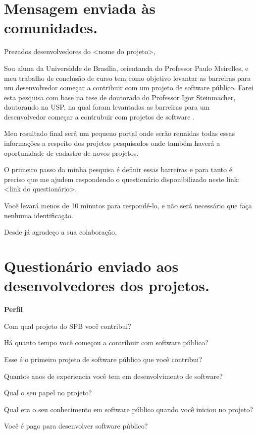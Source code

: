 \begin{anexosenv}

\partanexos

\chapter{Mensagem enviada às comunidades.}
\label{anexo a}

Prezados desenvolvedores do <nome do projeto>,

Sou aluna da Universidde de Brasília, orientanda do Professor
Paulo Meirelles, e meu trabalho de conclusão de curso tem como 
objetivo levantar as barreiras para um desenvolvedor 
começar a contribuir com um projeto de software público. Farei esta pesquisa 
com base na tese de doutorado do Professor Igor Steinmacher, doutorando na USP,
na qual foram levantadas as barreiras para um desenvolvedor começar a contrubuir 
com projetos de software .

Meu resultado final será um pequeno portal onde serão reunidas todas essas informações
a respeito dos projetos pesquisados onde também haverá a oportunidade de cadastro de
novos projetos.

O primeiro passo da minha pesquisa é definir essas barreiras e para tanto é
preciso que me ajudem respondendo o questionário disponibilizado neste link:
<link do questionário>.

Você levará menos de 10 minutos para respondê-lo, e não será necessário que faça
nenhuma identificação.

Desde já agradeço a sua colaboração,

\chapter{Questionário enviado aos desenvolvedores dos projetos.}
\label{anexo b}

\textbf{Perfil}

Com qual projeto do SPB você contribui?

Há quanto tempo você começou a contribuir com software público?

Esse é o primeiro projeto de software público que você contribui?

Quantos anos de experiencia você tem em desenvolvimento de software?

Qual o seu papel no projeto?

Qual era o seu conhecimento em software público quando você iniciou no projeto?

Você é pago para desenvolver software público?


\end{anexosenv}
